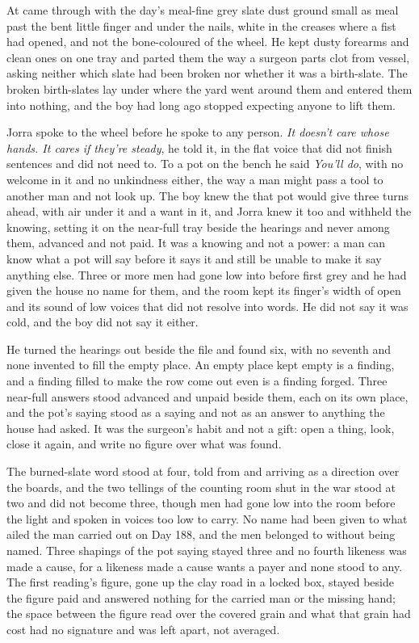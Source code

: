 At   came through with the day's meal-fine grey slate dust ground small as meal past the bent little finger and under the nails, white in the creases where a fist had opened, and not the bone-coloured  of the wheel. He kept dusty forearms and clean ones on one tray and parted them the way a surgeon parts clot from vessel, asking neither which slate had been broken nor whether it was a birth-slate. The broken birth-slates lay under  where the yard went around them and entered them into nothing, and the boy had long ago stopped expecting anyone to lift them.

Jorra spoke to the wheel before he spoke to any person. \emph{It doesn't care whose hands. It cares if they're steady}, he told it, in the flat voice that did not finish sentences and did not need to. To a pot on the bench he said \emph{You'll do}, with no welcome in it and no unkindness either, the way a man might pass a tool to another man and not look up. The boy knew the  that pot would give three turns ahead, with air under it and a want in it, and Jorra knew it too and withheld the knowing, setting it on the near-full tray beside the hearings and never among them, advanced and not paid. It was a knowing and not a power: a man can know what a pot will say before it says it and still be unable to make it say anything else. Three or more men had gone low into  before first grey and he had given the house no name for them, and the room kept its finger's width of open and its sound of low voices that did not resolve into words. He did not say it was cold, and the boy did not say it either.

He turned the hearings out beside the file and found six, with no seventh and none invented to fill the empty place. An empty place kept empty is a finding, and a finding filled to make the row come out even is a finding forged. Three near-full answers stood advanced and unpaid beside them, each on its own place, and the pot's saying stood as a saying and not as an answer to anything the house had asked. It was the surgeon's habit and not a gift: open a thing, look, close it again, and write no figure over what was found.

The burned-slate word stood at four, told from  and arriving as a direction over the boards, and the two tellings of the counting room shut in the war stood at two and did not become three, though men had gone low into the room before the light and spoken in voices too low to carry. No name had been given to what ailed the man carried out on Day 188, and the men belonged to  without being named. Three shapings of the pot saying stayed three and no fourth likeness was made a cause, for a likeness made a cause wants a payer and none stood to any. The first reading's figure, gone up the clay road in a locked box, stayed beside the figure paid and answered nothing for the carried man or the missing hand; the space between the figure read over the covered grain and what that grain had cost had no signature and was left apart, not averaged.

